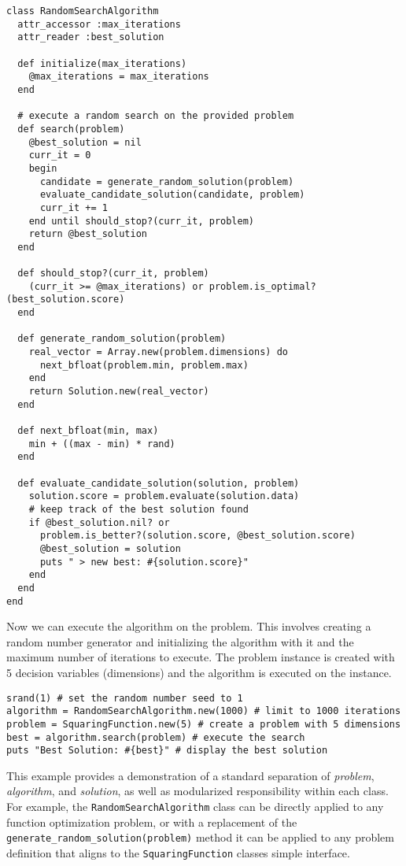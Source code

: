 \begin{lstlisting}
class RandomSearchAlgorithm
  attr_accessor :max_iterations
  attr_reader :best_solution
  
  def initialize(max_iterations)
    @max_iterations = max_iterations
  end
  
  # execute a random search on the provided problem
  def search(problem)    
    @best_solution = nil
    curr_it = 0
    begin
      candidate = generate_random_solution(problem)
      evaluate_candidate_solution(candidate, problem)
      curr_it += 1
    end until should_stop?(curr_it, problem)
    return @best_solution
  end
  
  def should_stop?(curr_it, problem)
    (curr_it >= @max_iterations) or problem.is_optimal?(best_solution.score)
  end
  
  def generate_random_solution(problem)
    real_vector = Array.new(problem.dimensions) do
      next_bfloat(problem.min, problem.max)
    end
    return Solution.new(real_vector)
  end

  def next_bfloat(min, max)
    min + ((max - min) * rand)
  end
  
  def evaluate_candidate_solution(solution, problem)
    solution.score = problem.evaluate(solution.data)
    # keep track of the best solution found
    if @best_solution.nil? or
      problem.is_better?(solution.score, @best_solution.score)
      @best_solution = solution
      puts " > new best: #{solution.score}"               
    end
  end  
end
\end{lstlisting}

Now we can execute the algorithm on the problem. This involves creating a random number generator and initializing the algorithm with it and the maximum number of iterations to execute. The problem instance is created with 5 decision variables (dimensions) and the algorithm is executed on the instance. 

\begin{lstlisting}
srand(1) # set the random number seed to 1
algorithm = RandomSearchAlgorithm.new(1000) # limit to 1000 iterations 
problem = SquaringFunction.new(5) # create a problem with 5 dimensions
best = algorithm.search(problem) # execute the search
puts "Best Solution: #{best}" # display the best solution
\end{lstlisting}

This example provides a demonstration of a standard separation of \emph{problem}, \emph{algorithm}, and \emph{solution}, as well as modularized responsibility within each class. For example, the \texttt{RandomSearchAlgorithm} class can be directly applied to any function optimization problem, or with a replacement of the \texttt{generate\_random\_solution(problem)} method it can be applied to any problem definition that aligns to the \texttt{SquaringFunction} classes simple interface. 

